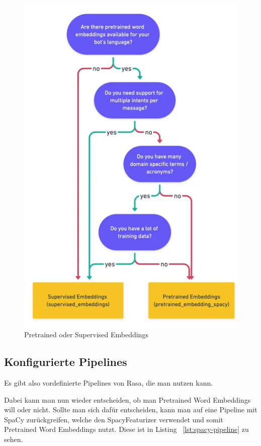 \begin{figure}[hbt!]
    \centering
    \includegraphics[scale=0.5]{pics/pre-trained-vs-supervised}
    \caption{Pretrained oder Supervised Embeddings~\cite{pretrainedVsSupervised, rasaMasterclassPreConfiguredPipelines}}
    \label{fig:pre_trained_vs_supervised}
\end{figure}

\subsection{Konfigurierte Pipelines}\label{subsec:configured-pipelines}

Es gibt also vordefinierte Pipelines von Rasa, die man nutzen kann.

Dabei kann man nun wieder entscheiden, ob man Pretrained Word Embeddings will oder nicht.
Sollte man sich dafür entscheiden, kann man auf eine Pipeline mit SpaCy zurückgreifen, welche den SpacyFeaturizer verwendet und somit Pretrained Word Embeddings nutzt.
Diese ist in Listing ~\ref{lst:spacy-pipeline} zu sehen.\cite{startingPipelines, allComponents}


